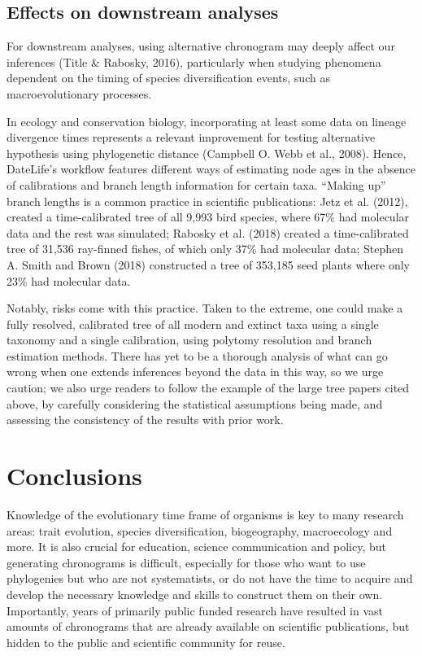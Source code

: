 \documentclass[
  man]{apa6}
\begin{document}
\hypertarget{effects-on-downstream-analyses}{%
\subsection{Effects on downstream analyses}\label{effects-on-downstream-analyses}}

For downstream analyses, using alternative chronogram may deeply affect our inferences (Title \& Rabosky, 2016), particularly when studying phenomena dependent on the timing of species diversification events, such as macroevolutionary processes.

In ecology and conservation biology, incorporating at least some data on lineage divergence times represents a relevant improvement for testing alternative hypothesis using phylogenetic distance (Campbell O. Webb et al., 2008).
Hence, DateLife's workflow features different ways of estimating node ages in the absence of calibrations and branch length information for certain taxa.
``Making up'' branch lengths is a common practice in scientific publications: Jetz et al. (2012), created a time-calibrated tree of all 9,993 bird species, where 67\% had molecular data and the rest was simulated; Rabosky et al. (2018) created a time-calibrated tree of 31,536 ray-finned fishes, of which only 37\% had molecular data; Stephen A. Smith and Brown (2018) constructed a tree of 353,185 seed plants where only 23\% had molecular data.

Notably, risks come with this practice.
Taken to the extreme, one could make a fully resolved, calibrated tree of all modern and extinct taxa using a single taxonomy and a single calibration, using polytomy resolution and branch estimation methods.
There has yet to be a thorough analysis of what can go wrong when one extends inferences beyond the data in this way, so we urge caution; we also urge readers to follow the example of the large tree papers cited above, by carefully considering the statistical assumptions being made, and assessing the consistency of the results with prior work.

\hypertarget{conclusions}{%
\section{Conclusions}\label{conclusions}}

Knowledge of the evolutionary time frame of organisms is key to many research areas: trait evolution,
species diversification, biogeography, macroecology and more. It is also crucial for education, science communication and policy, but generating chronograms is difficult,
especially for those who want to use phylogenies but who are not systematists, or
do not have the time to acquire and develop the necessary knowledge and skills to construct them on their own. Importantly, years of primarily public funded research have resulted in vast amounts of chronograms that are already available on scientific publications, but hidden to the public and scientific community for reuse.
\end{document}
